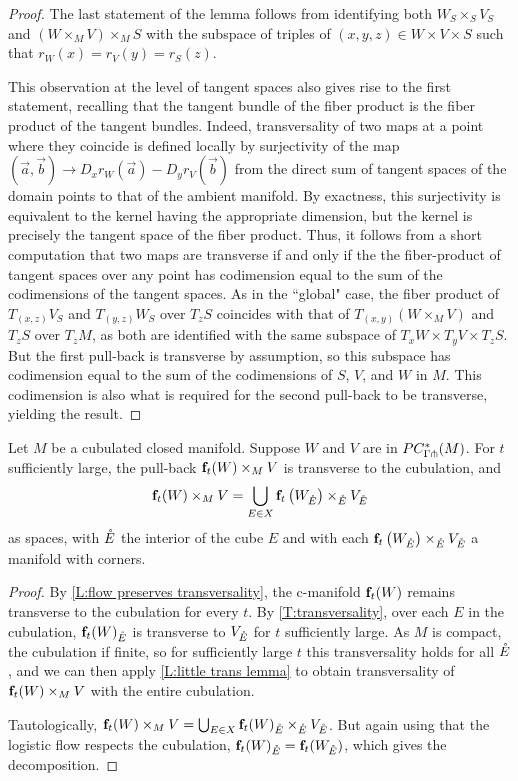 \begin{proof}
	The last statement of the lemma follows from identifying both $W_S \times_S V_S$ and $ (W \times_M V) \times_M S$ with
	the subspace of triples of $(x,y,z) \in W \times V \times S$ such that $r_W(x) = r_V(y) = r_S(z)$.

	This observation at the level of tangent spaces	also gives rise to the first statement, recalling that the tangent bundle of the fiber product is the fiber product of the tangent bundles.
	Indeed, transversality of two maps at a point where they coincide is defined locally by surjectivity of the map $(\vec a,\vec b)\to D_xr_W(\vec a)-D_yr_V(\vec b)$ from the direct sum of tangent spaces of the domain points to that of the ambient manifold.
	By exactness, this surjectivity is equivalent to the kernel having the appropriate dimension, but the kernel is precisely the tangent space of the	fiber product.
	Thus, it follows from a short computation that two maps are transverse if and only if the the fiber-product of tangent spaces over any point has codimension equal to the sum of the codimensions of the tangent spaces.
	As in the ``global" case, the fiber product of $T_{(x,z)} V_S$ and $T_{(y,z)} W_S$ over $T_zS$ coincides with that of $T_{(x,y)} (W \times_M V)$ and $T_z S$ over $T_z M$, as both are identified with the same subspace of $T_x W \times T_y V \times T_z S$.
	But the first pull-back is transverse by assumption, so this subspace has codimension equal to the sum of the codimensions of $S$, $V$, and $W$ in $M$.
	This codimension is also what is required for the second pull-back to be transverse, yielding the result.
\end{proof}

\begin{proposition}\label{P:locality}
	Let $M$ be a cubulated closed manifold.
	Suppose $W$ and $V$ are in $PC_{\Gamma \pitchfork}^*(M)$.
	For $t$ sufficiently large, the pull-back $\mathbf{f}_t(W) \times_M V$ is transverse to the cubulation, and
	\begin{equation*}
		\mathbf{f}_t(W) \times_M V = \bigcup_{E \in X} {\mathbf{f}_t\left(W_{\mathring{E}}\right)} \times_{\mathring{E}} V_{\mathring{E}}
	\end{equation*}
	as spaces, with $\mathring{E}$ the interior of the cube $E$ and with each ${\mathbf{f}_t\left(W_{\mathring{E}}\right)} \times_{\mathring{E}} V_{\mathring{E}}$ a manifold with corners.
\end{proposition}

\begin{proof}
	By \cref{L:flow preserves transversality}, the c-manifold $\mathbf{f}_t(W)$ remains transverse to the cubulation for every $t$.
	By \cref{T:transversality}, over each $E$ in the cubulation, $\mathbf{f}_t(W)_{\mathring{E}}$ is transverse to $V_{\mathring{E}}$ for $t$ sufficiently large.
	As $M$ is compact, the cubulation if finite, so for sufficiently large $t$ this transversality holds for all $\mathring{E}$, and we can then apply \cref{L:little trans lemma} to obtain transversality of $\mathbf{f}_t(W) \times_M V$ with the entire cubulation.

	Tautologically, $ \mathbf{f}_t(W) \times_M V = \bigcup_{E \in X} {\mathbf{f}_t(W)}_{\mathring{E}} \times_{\mathring{E}} V_{\mathring{E}}$.
	But again using that the logistic flow respects the cubulation, ${\mathbf{f}_t(W)}_{\mathring{E}} = {\mathbf{f}_t(W_{\mathring{E}})}$, which gives the decomposition.\qedhere
\end{proof}

